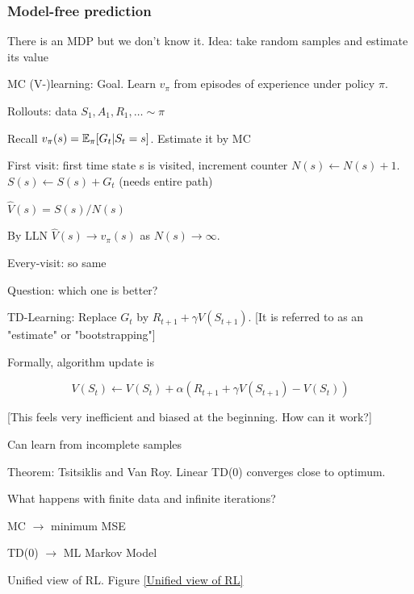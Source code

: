 \documentclass[english]{article}
\begin{document}
\eenum 


\subsubsection{Model-free prediction}
\benum

\item There is an MDP but we don't know it. Idea: take random samples and estimate its value

\item MC (V-)learning: Goal. Learn $v_\pi$ from episodes of experience under policy $\pi$. 

Rollouts: data $S_1,A_1,R_1,\ldots \sim \pi$

Recall $v_\pi(s) = \mathbb{E}_\pi[G_t|S_t=s]$. Estimate it by MC

\item First visit: first time state s is visited, increment counter $N(s) \gets N(s)+1$. $S(s) \gets S(s)+G_t$ (needs entire path)

$\hat V(s) = S(s)/N(s)$

By LLN $\hat V(s) \to v_\pi(s)$ as $N(s)\to \infty$. 

\item Every-visit: so same

Question: which one is better?

\item TD-Learning: Replace $G_t$ by $R_{t+1}+\gamma V(S_{t+1})$. [It is referred to as an "estimate" or "bootstrapping"]

Formally, algorithm update is

$$V(S_t) \gets V(S_t)+\alpha(R_{t+1}+
\gamma V(S_{t+1})- V(S_{t}))$$ 

[This feels very inefficient and biased at the beginning. How can it work?]

Can learn from incomplete samples

Theorem: Tsitsiklis and Van Roy. Linear TD(0) converges close to optimum. 

\item What happens with finite data and infinite iterations?

MC $\to $ minimum MSE

TD(0) $\to $ ML Markov Model 

\item Unified view of RL. Figure \ref{Unified view of RL}
\end{document}
